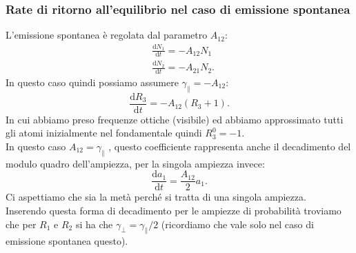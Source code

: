\subsubsection{Rate di ritorno all'equilibrio nel caso di emissione spontanea}%
L'emissione spontanea è regolata dal parametro $A_{12}$:
\[\begin{aligned}
&\frac{\text{d} N_1}{\text{d} t} = -A_{12}N_1\\
&\frac{\text{d} N_2}{\text{d} t} = -A_{21}N_2	
.\end{aligned}\]
In questo caso quindi possiamo assumere $\gamma_\parallel = -A_{12}$:
\[
    \frac{\text{d} R_3}{\text{d} t} = -A_{12}\left(R_3+1\right)
.\] 
In cui abbiamo preso frequenze ottiche (visibile) ed abbiamo approssimato tutti gli atomi inizialmente nel fondamentale quindi $R_3^0 = -1$.\\
In questo caso $A_{12} = \gamma_\parallel$ , questo coefficiente rappresenta anche il decadimento del modulo quadro dell'ampiezza, per la singola ampiezza invece:
\[
\frac{\text{d} a_1}{\text{d} t} = \frac{A_{12}}{2}a_1
.\] 
Ci aspettiamo che sia la metà perché si tratta di una singola ampiezza.\\
Inserendo questa forma di decadimento per le ampiezze di probabilità troviamo che per $R_1$  e $R_2$  si ha che $\gamma_\perp  = \gamma_\parallel /2$ (ricordiamo che vale solo nel caso di emissione spontanea questo).
